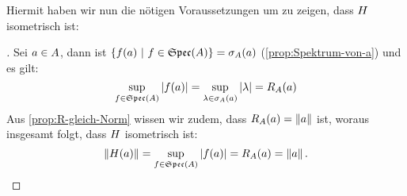 Hiermit haben wir nun die nötigen Voraussetzungen um zu zeigen, dass $H$ isometrisch ist:

\begin{proof}[]
Sei $a \in A$, dann ist $\{f(a) ~|~ f \in \mathfrak{Spec}(A)\} = \sigma_A(a)$ (\cref{prop:Spektrum-von-a}) und es gilt:
	\[\underset{f \in \mathfrak{Spec}(A)}{\sup}\left|f(a)\right| = \underset{\lambda \in \sigma_A(a)}{\sup}\left|\lambda\right| = R_A(a)\]
Aus \cref{prop:R-gleich-Norm} wissen wir zudem, dass $R_A(a) = \left\lVert a\right\rVert$ ist, woraus insgesamt folgt, dass $H$ isometrisch ist:
	\[\left\lVert H(a)\right\rVert = \underset{f \in \mathfrak{Spec}(A)}{\sup}\left|f(a)\right| = R_A(a) = \left\lVert a\right\rVert.\]
\let\qed\relax
\end{proof}